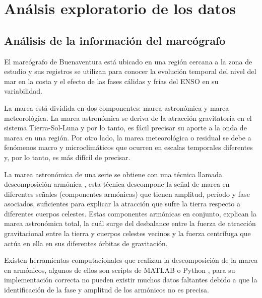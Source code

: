 \section{Análsis exploratorio de los datos}

\subsection{Análisis de la información del mareógrafo}

El mareógrafo de Buenaventura está ubicado en una región cercana a la zona de estudio y sus registros se utilizan para conocer la evolución temporal del nivel del mar en la costa y el efecto de las fases cálidas y frías del ENSO en su variabilidad.

La marea está dividida en dos componentes: marea astronómica y marea meteorológica. La marea astronómica se deriva de la atracción gravitatoria en el sistema Tierra-Sol-Luna y por lo tanto, es fácil precisar su aporte a la onda de marea en una región. Por otro lado, la marea meteorológica o residual se debe a fenómenos macro y microclimáticos que ocurren en escalas temporales diferentes y, por lo tanto, es más difícil de precisar.

La marea astronómica de una serie se obtiene con una técnica llamada descomposición armónica \cite{Dronkers1975}, esta técnica descompone la señal de marea en diferentes señales (componentes armónicas) que tienen amplitud, período y fase asociados, suficientes para explicar la atracción que sufre la tierra respecto a diferentes cuerpos celestes. Estas componentes armónicas en conjunto, explican la marea astronómica total, la cuál surge del desbalance entre la fuerza de atracción gravitacional entre la tierra y cuerpos celestes vecinos y la fuerza centrífuga que actúa en ella en sus diferentes órbitas de gravitación.

Existen herramientas computacionales que realizan la descomposición de la marea en armónicos, algunos de ellos son scripts de MATLAB o Python \cite{Pawlowicz2002}, para su implementación correcta no pueden existir muchos datos faltantes debido a que la identificación de la fase y amplitud de los armónicos no es precisa.

